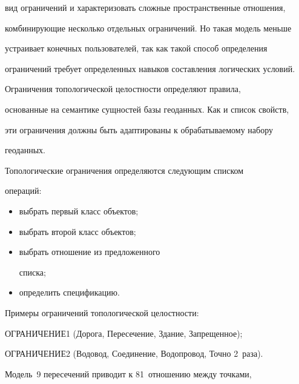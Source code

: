вид ограничений и характеризовать сложные пространственные отношения, 


комбинирующие несколько отдельных ограничений. Но такая модель меньше 


устраивает конечных пользователей, так как такой способ определения 


ограничений требует определенных навыков составления логических условий. 


    


    Ограничения топологической целостности определяют правила, 


основанные на семантике сущностей базы геоданных. Как и список свойств, 


эти ограничения должны быть адаптированы к обрабатываемому набору 


геоданных. 


    


    Топологические ограничения определяются следующим списком 


операций: 


    \begin{itemize} %


\item выбрать первый класс объектов; 


\item выбрать второй класс объектов; 


\item выбрать отношение из предложенного 


списка; 


\item определить спецификацию. 


\end{itemize}


     


Примеры ограничений топологической целостности: 





ОГРАНИЧЕНИЕ1 (Дорога, Пересечение, Здание, Запрещенное); 





ОГРАНИЧЕНИЕ2 (Водовод, Соединение, Водопровод, Точно 2~раза). 





     Модель~9 пересечений приводит к 81~отношению между точками, 



